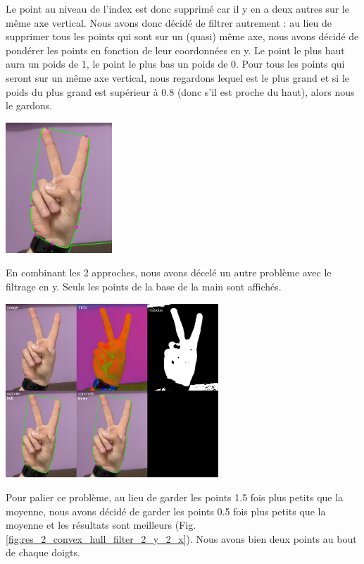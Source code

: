 \documentclass[11pt]{article}
\begin{document}
Le point au niveau de l'index est donc supprimé car il y en a deux autres sur le même axe vertical. Nous avons donc décidé de filtrer autrement : au lieu de supprimer tous les points qui sont sur un (quasi) même axe, nous avons décidé de pondérer les points en fonction de leur coordonnées en y. Le point le plus haut aura un poids de 1, le point le plus bas un poids de 0. Pour tous les points qui seront sur un même axe vertical, nous regardons lequel est le plus grand et si le poids du plus grand est supérieur à 0.8 (donc s'il est proche du haut), alors nous le gardons.
\begin{center}
    \includegraphics[width=0.3\textwidth]{images/res_2_convex_hull_all_pt.png}
    \label{fig:res_2_convex_hull_all_pt}
\end{center}
En combinant les 2 approches, nous avons décelé un autre problème avec le filtrage en y. Seuls les points de la base de la main sont affichés.
\begin{center}
    \includegraphics[width=0.6\textwidth]{images/res_2_convex_hull_filter_1_y_2_x.png}
    \label{fig:res_2_convex_hull_filter_1_y_2_x}
\end{center}
Pour palier ce problème, au lieu de garder les points 1.5 fois plus petits que la moyenne, nous avons décidé de garder les points 0.5 fois plus petits que la moyenne et les résultats sont meilleurs (Fig. \ref{fig:res_2_convex_hull_filter_2_y_2_x}). Nous avons bien deux points au bout de chaque doigts.
\end{document}

